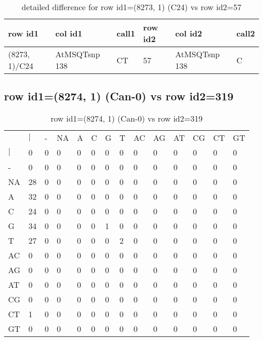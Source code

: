 \begin{center}
\begin{longtable}{|l|l|l|l|l|l|}
\caption{detailed difference for row id1=(8273, 1) (C24) vs row id2=57} \label{table_dm235}\\
\hline
row id1&col id1&call1&row id2&col id2&call2\\
\hline
(8273, 1)/C24&AtMSQTsnp 138&CT&57&AtMSQTsnp 138&C\\
\hline
\end{longtable}
\end{center}

\subsection{row id1=(8274, 1) (Can-0) vs row id2=319}
\begin{center}
\begin{longtable}{|l|l|l|l|l|l|l|l|l|l|l|l|l|l|}
\caption{row id1=(8274, 1) (Can-0) vs row id2=319} \label{table_dm236}\\
\hline
\\
\hline
&$|$&-&NA&A&C&G&T&AC&AG&AT&CG&CT&GT\\
$|$&0&0&0&0&0&0&0&0&0&0&0&0&0\\
-&0&0&0&0&0&0&0&0&0&0&0&0&0\\
NA&28&0&0&0&0&0&0&0&0&0&0&0&0\\
A&32&0&0&0&0&0&0&0&0&0&0&0&0\\
C&24&0&0&0&0&0&0&0&0&0&0&0&0\\
G&34&0&0&0&0&1&0&0&0&0&0&0&0\\
T&27&0&0&0&0&0&2&0&0&0&0&0&0\\
AC&0&0&0&0&0&0&0&0&0&0&0&0&0\\
AG&0&0&0&0&0&0&0&0&0&0&0&0&0\\
AT&0&0&0&0&0&0&0&0&0&0&0&0&0\\
CG&0&0&0&0&0&0&0&0&0&0&0&0&0\\
CT&1&0&0&0&0&0&0&0&0&0&0&0&0\\
GT&0&0&0&0&0&0&0&0&0&0&0&0&0\\
\hline
\end{longtable}
\end{center}

